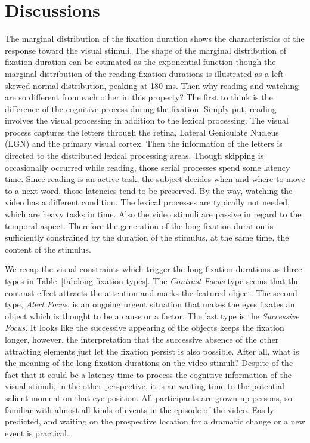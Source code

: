 \documentclass[10pt,letterpaper]{article}
\begin{document}
\section{Discussions}

The marginal distribution of the fixation duration shows the characteristics of the response toward the visual stimuli. The shape of the marginal distribution of fixation duration can be estimated as the exponential function though the marginal distribution of the reading fixation durations is illustrated as a left-skewed normal distribution, peaking at 180 ms. Then why reading and watching are so different from each other in this property? The first to think is the difference of the cognitive process during the fixation. Simply put, reading involves the visual processing in addition to the lexical processing. The visual process captures the letters through the retina, Lateral Geniculate Nucleus (LGN) and the primary visual cortex. Then the information of the letters is directed to the distributed lexical processing areas. Though skipping is occasionally occurred while reading, those serial processes spend some latency time. Since reading is an active task, the subject decides when and where to move to a next word, those latencies tend to be preserved. By the way, watching the video has a different condition. The lexical processes are typically not needed, which are heavy tasks in time. Also the video stimuli are passive in regard to the temporal aspect. Therefore the generation of the long fixation duration is sufficiently constrained by the duration of the stimulus, at the same time, the content of the stimulus. 

We recap the visual constraints which trigger the long fixation durations as three types in Table~\ref{tab:long-fixation-types}. The \textit{Contrast Focus} type seems that the contrast effect attracts the attention and marks the featured object. The second type, \textit{Alert Focus}, is an ongoing urgent situation that makes the eyes fixates an object which is thought to be a cause or a factor. The last type is the \textit{Successive Focus}. It looks like the successive appearing of the objects keeps the fixation longer, however, the interpretation that the successive absence of the other attracting elements just let the fixation persist is also possible. After all, what is the meaning of the long fixation durations on the video stimuli? Despite of the fact that it could be a latency time to process the cognitive information of the visual stimuli, in the other perspective, it is an waiting time to the potential salient moment on that eye position. All participants are grown-up persons, so familiar with almost all kinds of events in the episode of the video. Easily predicted, and waiting on the prospective location for a dramatic change or a new event is practical.
\end{document}
